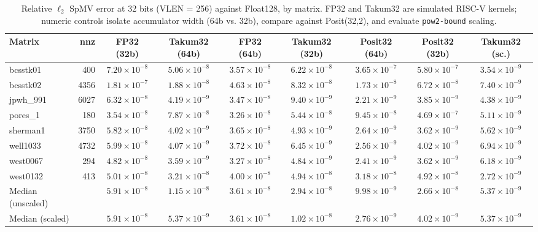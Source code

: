 \begin{table}[t]
\caption{Relative $\ell_2$ SpMV error at 32 bits (VLEN = 256) against Float128, by matrix. FP32 and Takum32 are simulated RISC-V kernels; numeric controls isolate accumulator width (64b vs. 32b), compare against Posit(32,2), and evaluate \texttt{pow2-bound} scaling.}
\label{tab:precisao32}
\centering
\scriptsize
\setlength{\tabcolsep}{3.2pt}
\renewcommand{\arraystretch}{0.96}
\begin{tabular}{@{}lrccccccc@{}}
\toprule
Matrix & nnz & FP32 (32b) & Takum32 (64b) & FP32 (64b) & Takum32 (32b) & Posit32 (64b) & Posit32 (32b) & Takum32 (sc.) \\
\midrule
bcsstk01 & 400 & $7.20 \times 10^{-8}$ & $5.06 \times 10^{-8}$ & $3.57 \times 10^{-8}$ & $6.22 \times 10^{-8}$ & $3.65 \times 10^{-7}$ & $5.80 \times 10^{-7}$ & $3.54 \times 10^{-9}$ \\
bcsstk02 & 4356 & $1.81 \times 10^{-7}$ & $1.88 \times 10^{-8}$ & $4.63 \times 10^{-8}$ & $8.32 \times 10^{-8}$ & $1.73 \times 10^{-8}$ & $6.72 \times 10^{-8}$ & $7.40 \times 10^{-9}$ \\
jpwh\_991 & 6027 & $6.32 \times 10^{-8}$ & $4.19 \times 10^{-9}$ & $3.47 \times 10^{-8}$ & $9.40 \times 10^{-9}$ & $2.21 \times 10^{-9}$ & $3.85 \times 10^{-9}$ & $4.38 \times 10^{-9}$ \\
pores\_1 & 180 & $3.54 \times 10^{-8}$ & $7.87 \times 10^{-8}$ & $3.26 \times 10^{-8}$ & $5.44 \times 10^{-8}$ & $9.45 \times 10^{-8}$ & $4.69 \times 10^{-7}$ & $5.11 \times 10^{-9}$ \\
sherman1 & 3750 & $5.82 \times 10^{-8}$ & $4.02 \times 10^{-9}$ & $3.65 \times 10^{-8}$ & $4.93 \times 10^{-9}$ & $2.64 \times 10^{-9}$ & $3.62 \times 10^{-9}$ & $5.62 \times 10^{-9}$ \\
well1033 & 4732 & $5.99 \times 10^{-8}$ & $4.07 \times 10^{-9}$ & $3.72 \times 10^{-8}$ & $6.45 \times 10^{-9}$ & $2.56 \times 10^{-9}$ & $4.02 \times 10^{-9}$ & $6.94 \times 10^{-9}$ \\
west0067 & 294 & $4.82 \times 10^{-8}$ & $3.59 \times 10^{-9}$ & $3.27 \times 10^{-8}$ & $4.84 \times 10^{-9}$ & $2.41 \times 10^{-9}$ & $3.62 \times 10^{-9}$ & $6.18 \times 10^{-9}$ \\
west0132 & 413 & $5.01 \times 10^{-8}$ & $3.21 \times 10^{-8}$ & $4.00 \times 10^{-8}$ & $4.94 \times 10^{-8}$ & $3.18 \times 10^{-8}$ & $4.92 \times 10^{-8}$ & $2.72 \times 10^{-9}$ \\
\midrule
Median (unscaled) & & $5.91 \times 10^{-8}$ & $1.15 \times 10^{-8}$ & $3.61 \times 10^{-8}$ & $2.94 \times 10^{-8}$ & $9.98 \times 10^{-9}$ & $2.66 \times 10^{-8}$ & $5.37 \times 10^{-9}$ \\
Median (scaled) & & $5.91 \times 10^{-8}$ & $5.37 \times 10^{-9}$ & $3.61 \times 10^{-8}$ & $1.02 \times 10^{-8}$ & $2.76 \times 10^{-9}$ & $4.02 \times 10^{-9}$ & $5.37 \times 10^{-9}$ \\
\bottomrule
\end{tabular}
\end{table}
